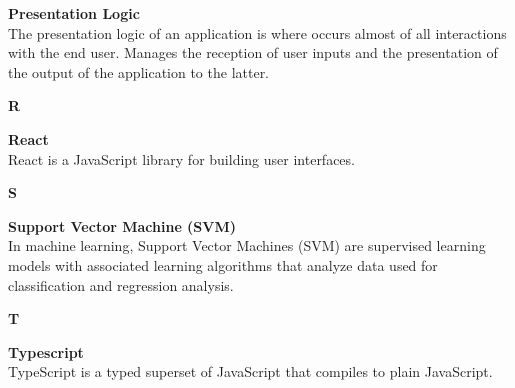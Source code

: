 \textbf{Presentation Logic}\\
The presentation logic of an application is where occurs almost of all interactions with the end user. Manages the reception of user inputs and the presentation of the output of the application to the latter.

{\Large\textbf{R}\par}
\textbf{React}\\
React is a JavaScript library for building user interfaces.

{\Large\textbf{S}\par}
\textbf{Support Vector Machine (SVM)}\\
In machine learning, Support Vector Machines (SVM) are supervised learning models with associated learning algorithms that analyze data used for classification and regression analysis.

{\Large\textbf{T}\par}
\textbf{Typescript}\\
TypeScript is a typed superset of JavaScript that compiles to plain JavaScript.

